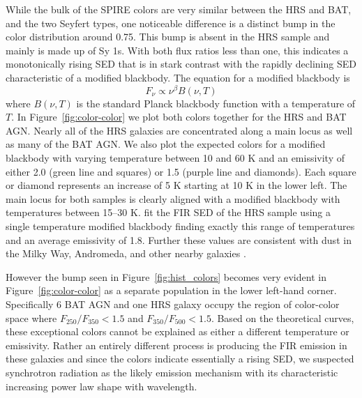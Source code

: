 While the bulk of the SPIRE colors are very similar between the HRS and BAT, and the two Seyfert types, one noticeable difference is a distinct bump in the color distribution around 0.75. This bump is absent in the HRS sample and mainly is made up of Sy 1s. With both flux ratios less than one, this indicates a monotonically rising SED that is in stark contrast with the rapidly declining SED characteristic of a modified blackbody. The equation for a modified blackbody is
\begin{equation}\label{eq:mod_blackbody}
F_{\nu} \propto \nu^{\beta}B(\nu, T)
\end{equation}
\noindent where $B(\nu, T)$ is the standard Planck blackbody function with a temperature of $T$. In Figure~\ref{fig:color-color} we plot both colors together for the HRS and BAT AGN. Nearly all of the HRS galaxies are concentrated along a main locus as well as many of the BAT AGN. We also plot the expected colors for a modified blackbody with varying temperature between 10 and 60 K and an emissivity of either 2.0 (green line and squares) or 1.5 (purple line and diamonds). Each square or diamond represents an increase of 5 K starting at 10 K in the lower left. The main locus for both samples is clearly aligned with a modified blackbody with temperatures between 15--30 K. \cite{Cortese:2014qq} fit the FIR SED of the HRS sample using a single temperature modified blackbody finding exactly this range of temperatures and an average emissivity of 1.8. Further these values are consistent with dust in the Milky Way, Andromeda, and other nearby galaxies \citep{Galametz:2012uq, Boselli:2012qv, Smith:2012fj}. 

However the bump seen in Figure~\ref{fig:hist_colors} becomes very evident in Figure~\ref{fig:color-color} as a separate population in the lower left-hand corner. Specifically 6 BAT AGN and one HRS galaxy occupy the region of color-color space where $F_{250}/F_{350} < 1.5$ and $F_{350}/F_{500} < 1.5$. Based on the theoretical curves, these exceptional colors cannot be explained as either a different temperature or emissivity. Rather an entirely different process is producing the FIR emission in these galaxies and since the colors indicate essentially a rising SED, we suspected synchrotron radiation as the likely emission mechanism with its characteristic increasing power law shape with wavelength.
  
  
  